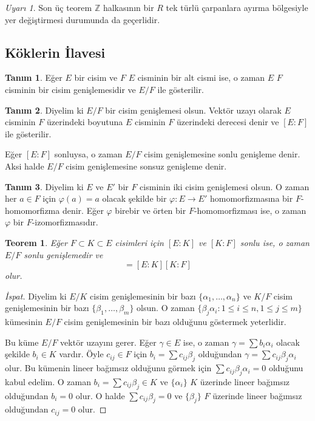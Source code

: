 \documentclass{article}
\newtheorem{thm}{Teorem}[section]
\theoremstyle{definition}
\newtheorem{defn}{Tanım}[section]
\theoremstyle{remark}
\newtheorem{rem}{Uyarı}[section]
\begin{document}
			\begin{rem}
			    Son üç teorem $\mathbb{Z}$ halkasının bir $R$ tek türlü çarpanlara ayırma bölgesiyle yer değiştirmesi durumunda da geçerlidir.
			\end{rem}
			
		\subsection{Köklerin İlavesi}
		
			\begin{defn}
			    Eğer $E$ bir cisim ve $F$ $E$ cisminin bir alt cismi ise, o zaman $E$ $F$ cisminin bir cisim genişlemesidir ve $E/F$ ile gösterilir.
			\end{defn}
			
			\begin{defn}
			    Diyelim ki $E/F$ bir cisim genişlemesi olsun. Vektör uzayı olarak $E$ cisminin $F$ üzerindeki boyutuna $E$ cisminin $F$ üzerindeki derecesi denir ve $[E:F]$ ile gösterilir.\par
			    Eğer $[E : F]$ sonluysa, o zaman $E/F$ cisim genişlemesine sonlu genişleme denir. Aksi halde $E/F$ cisim genişlemesine sonsuz genişleme denir.
			\end{defn}
			
			\begin{defn}
			    Diyelim ki $E$ ve $E'$ bir $F$ cisminin iki cisim genişlemesi olsun. O zaman her $a \in F$ için $\varphi(a) = a$ olacak şekilde bir $\varphi:  E \to E'$ homomorfizmasına bir $F$-homomorfizma denir. Eğer $\varphi$ birebir ve örten bir $F$-homomorfizması ise, o zaman $\varphi$ bir $F$-izomorfizmasıdır.
			\end{defn}
			
			\begin{thm}\label{3.5}
				Eğer $F \subset K \subset E$ cisimleri için $[E : K]$ ve $[K : F]$ sonlu ise, o zaman $E/F$ sonlu genişlemedir ve
				\begin{equation*}
					[E : F] = [E : K][K : F]
				\end{equation*}
				olur.
			\end{thm}
			
			\begin{proof}[İspat]
			    Diyelim ki $E/K$ cisim genişlemesinin bir bazı $\{\alpha_1, \dots, \alpha_n\}$ ve $K/F$ cisim genişlemesinin bir bazı $\{\beta_1, \dots, \beta_m\}$ olsun. O zaman $\{\beta_j\alpha_i : 1 \leq i \leq n, 1 \leq j \leq m\}$ kümesinin $E/F$ cisim genişlemesinin bir bazı olduğunu göstermek yeterlidir.\par
			    Bu küme $E/F$ vektör uzayını gerer. Eğer $\gamma \in E$ ise, o zaman $\gamma = \sum{b_i\alpha_i}$ olacak şekilde $b_i \in K$ vardır. Öyle $c_{ij} \in F$ için $b_i = \sum{c_{ij}\beta_j}$ olduğundan $\gamma = \sum{c_{ij}\beta_j\alpha_i}$ olur. Bu kümenin lineer bağımsız olduğunu görmek için $\sum{c_{ij}\beta_j\alpha_i} = 0$ olduğunu kabul edelim. O zaman $b_i = \sum{c_{ij}\beta_j} \in K$ ve $\{\alpha_i\}$ $K$ üzerinde lineer bağımsız olduğundan $b_i = 0$ olur. O halde $\sum{c_{ij}\beta_j} = 0$ ve $\{\beta_j\}$ $F$ üzerinde lineer bağımsız olduğundan $c_{ij} = 0$ olur.
			\end{proof}
			
\end{document}
